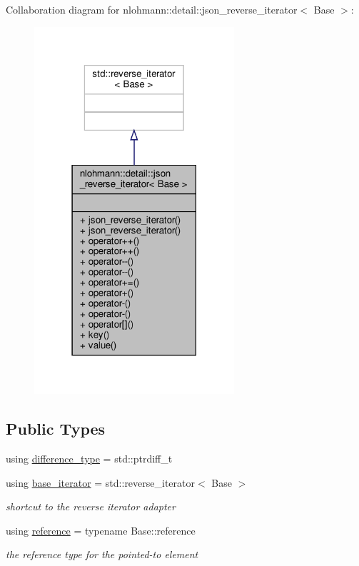 Collaboration diagram for nlohmann\+:\+:detail\+:\+:json\+\_\+reverse\+\_\+iterator$<$ Base $>$\+:
\nopagebreak
\begin{figure}[H]
\begin{center}
\leavevmode
\includegraphics[width=210pt]{classnlohmann_1_1detail_1_1json__reverse__iterator__coll__graph}
\end{center}
\end{figure}
\subsection*{Public Types}
\begin{DoxyCompactItemize}
\item 
using \hyperlink{classnlohmann_1_1detail_1_1json__reverse__iterator_a9ab55987c05ec6427ad36082e351cc45}{difference\+\_\+type} = std\+::ptrdiff\+\_\+t
\item 
using \hyperlink{classnlohmann_1_1detail_1_1json__reverse__iterator_a6b2ef1d632fe49bfcc22fbd1abd62395}{base\+\_\+iterator} = std\+::reverse\+\_\+iterator$<$ Base $>$
\begin{DoxyCompactList}\small\item\em shortcut to the reverse iterator adapter \end{DoxyCompactList}\item 
using \hyperlink{classnlohmann_1_1detail_1_1json__reverse__iterator_a42f51a69bac7b2aebb613b2164e457f1}{reference} = typename Base\+::reference
\begin{DoxyCompactList}\small\item\em the reference type for the pointed-\/to element \end{DoxyCompactList}\end{DoxyCompactItemize}
